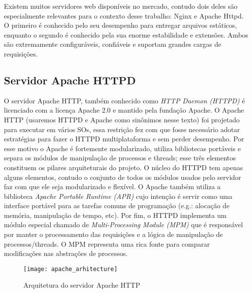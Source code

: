 Existem muitos servidores web disponíveis no mercado, contudo dois deles são
especialmente relevantes para o contexto desse trabalho: Nginx e Apache Httpd.
O primeiro é conhecido pelo seu desempenho para entregar arquivos estáticos,
enquanto o segundo é conhecido pela sua enorme estabilidade e extensões. Ambos
são extremamente configuráveis, confiáveis e suportam grandes cargas de
requisições.

\subsection{Servidor Apache HTTPD}
\label{sec:architecture}

O servidor Apache HTTP, também conhecido como \textit{HTTP Daemon (HTTPD)} é
licenciado com a licença Apache 2.0 e mantido pela fundação Apache.  O Apache
HTTP (usaremos HTTPD e Apache como sinônimos nesse texto) foi projetado para
executar em vários SOs, essa restrição fez com que fosse necessário adotar
estratégias para fazer o HTTPD multiplataforma e sem perder desempenho. Por
esse motivo o Apache é fortemente modularizado, utiliza bibliotecas portáveis e
separa os módulos de manipulação de processos e threads; esse três elementos
constituem os pilares arquiteturais do projeto. O núcleo do HTTPD tem apenas
alguns elementos, contudo o conjunto de todos os módulos usados pelo servidor
faz com que ele seja modularizado e flexível. O Apache também utiliza a
biblioteca \textit{Apache Portable Runtime (APR)} cujo intenção é servir como
uma interface portável para as tarefas comuns de programação (e.g.: alocação de
memória, manipulação de tempo, etc). Por fim, o HTTPD implementa um módulo
especial chamado de \textit{Multi-Processing Module (MPM)} que é responsável
por manter o processamento das requisições e a lógica de manipulação de
processos/threads. O MPM representa uma rica fonte para comparar modificações
nas abstrações de processos.

\begin{figure}[!h]
  \centering
  \texttt{[image: apache\_arhitecture]} 
  \caption{Arquitetura do servidor Apache HTTP \citep{apache_module_book}}
  \label{fig:apache_architecture} 
\end{figure}


